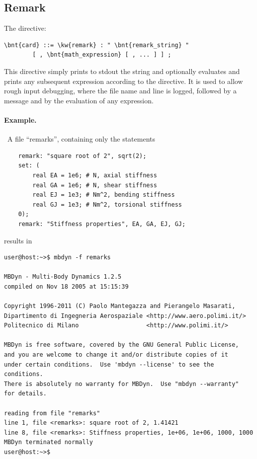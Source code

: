 \subsection{Remark}
The  directive:
\begin{Verbatim}[commandchars=\\\{\}]
    \bnt{card} ::= \kw{remark} : " \bnt{remark_string} "
        [ , \bnt{math_expression} [ , ... ] ] ;
\end{Verbatim}
This directive simply prints to stdout the string  and
optionally evaluates and prints any subsequent expression 
according to the  directive.
It is used to allow rough input debugging, where the file name and line 
is logged, followed by a message and by the evaluation of any expression. 

\paragraph{Example.} \
A file ``remarks'', containing only the statements
\begin{verbatim}
    remark: "square root of 2", sqrt(2);
    set: (
        real EA = 1e6; # N, axial stiffness
        real GA = 1e6; # N, shear stiffness
        real EJ = 1e3; # Nm^2, bending stiffness
        real GJ = 1e3; # Nm^2, torsional stiffness
    0);
    remark: "Stiffness properties", EA, GA, EJ, GJ;
\end{verbatim}
results in
\begin{verbatim}
user@host:~>$ mbdyn -f remarks

MBDyn - Multi-Body Dynamics 1.2.5
compiled on Nov 18 2005 at 15:15:39

Copyright 1996-2011 (C) Paolo Mantegazza and Pierangelo Masarati,
Dipartimento di Ingegneria Aerospaziale <http://www.aero.polimi.it/>
Politecnico di Milano                   <http://www.polimi.it/>

MBDyn is free software, covered by the GNU General Public License,
and you are welcome to change it and/or distribute copies of it
under certain conditions.  Use 'mbdyn --license' to see the conditions.
There is absolutely no warranty for MBDyn.  Use "mbdyn --warranty"
for details.

reading from file "remarks"
line 1, file <remarks>: square root of 2, 1.41421
line 8, file <remarks>: Stiffness properties, 1e+06, 1e+06, 1000, 1000
MBDyn terminated normally
user@host:~>$
\end{verbatim}



